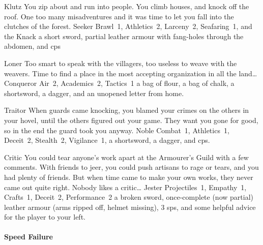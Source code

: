 \begin{multicols}{2}
\begin{itemize}
    {Klutz}%
    {
      You zip about and run into people.
      You climb houses, and knock off the roof.
      One too many misadventures and it was time to let you fall into the clutches of the forest.
    }%
    {Seeker}%
    {Brawl~1, Athletics~2, Larceny~2, Seafaring~1, and the Knack \charge}%
    {a short sword, partial leather armour with fang-holes through the abdomen, and  \glspl{cp}}%

    {Loner}%
    {
      Too smart to speak with the villagers, too useless to weave with the weavers.
      Time to find a place in the most accepting organization in all the land\ldots
    }%
    {Conqueror}%
    {
      Air~2, Academics~2, Tactics~1
    }%
    {a bag of flour, a bag of chalk, a shortsword, a dagger, and an unopened letter from home.}%

    {Traitor}%
    {
      When guards came knocking, you blamed your crimes on the others in your hovel, until the others figured out your game.
      They want you gone for good, so in the end the \gls{guard} took you anyway.
    }%
    {Noble}%
    {
      Combat~1, Athletics~1, Deceit~2, Stealth~2, Vigilance~1,
    }%
    {a shortsword, a dagger, and  \glspl{cp}.}%

    {Critic}%
    {
      You could tear anyone's work apart at the Armourer's Guild with a few comments.
      With friends to jeer, you could push artisans to rage or tears, and you had plenty of friends.
      But when time came to make your own works, they never came out quite right.
      Nobody likes a critic\ldots
    }%
    {Jester}%
    {
      Projectiles~1, Empathy~1, Crafts~1, Deceit~2, Performance~2
    }%
    {a broken sword, once-complete (now partial) leather armour (arms ripped off, helmet missing), 3 \glspl{sp}, and some helpful advice for the player to your left.}%

\end{itemize}

\paragraph{Speed Failure}

\begin{itemize}


\end{itemize}
\end{multicols}
